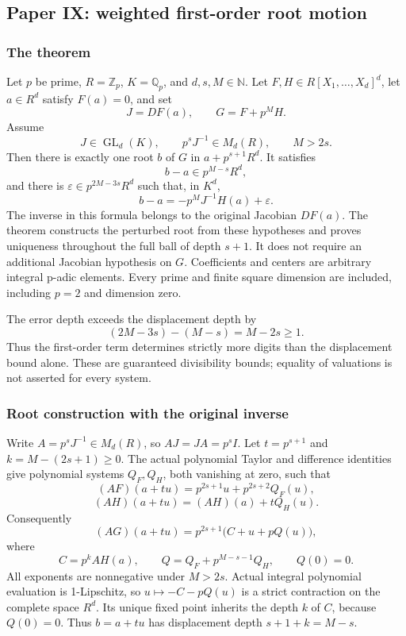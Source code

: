 \hypertarget{cont7:paper-ix-weighted-first-order-root-motion}{%
\subsection{Paper IX: weighted first-order root
motion}\label{cont7:paper-ix-weighted-first-order-root-motion}}

\hypertarget{cont7:the-theorem}{%
\subsubsection{The theorem}\label{cont7:the-theorem}}

Let \(p\) be prime, \(R=\mathbb Z_p\), \(K=\mathbb Q_p\), and
\(d,s,M\in\mathbb N\). Let \(F,H\in R[X_1,\ldots,X_d]^d\), let
\(a\in R^d\) satisfy \(F(a)=0\), and set \[
J=DF(a),\qquad G=F+p^M H.
\] Assume \[
J\in\operatorname{GL}_d(K),\qquad p^sJ^{-1}\in M_d(R),\qquad M>2s.
\] Then there is exactly one root \(b\) of \(G\) in \(a+p^{s+1}R^d\). It
satisfies \[
b-a\in p^{M-s}R^d,
\] and there is \(\varepsilon\in p^{2M-3s}R^d\) such that, in \(K^d\),
\[
\boxed{b-a=-p^M J^{-1}H(a)+\varepsilon.}
\] The inverse in this formula belongs to the original Jacobian
\(DF(a)\). The theorem constructs the perturbed root from these
hypotheses and proves uniqueness throughout the full ball of depth
\(s+1\). It does not require an additional Jacobian hypothesis on \(G\).
Coefficients and centers are arbitrary integral p-adic elements. Every
prime and finite square dimension are included, including \(p=2\) and
dimension zero.

The error depth exceeds the displacement depth by \[
(2M-3s)-(M-s)=M-2s\ge1.
\] Thus the first-order term determines strictly more digits than the
displacement bound alone. These are guaranteed divisibility bounds;
equality of valuations is not asserted for every system.

\hypertarget{cont7:root-construction-with-the-original-inverse}{%
\subsubsection{Root construction with the original
inverse}\label{cont7:root-construction-with-the-original-inverse}}

Write \(A=p^sJ^{-1}\in M_d(R)\), so \(AJ=JA=p^sI\). Let \(t=p^{s+1}\)
and \(k=M-(2s+1)\ge0\). The actual polynomial Taylor and difference
identities give polynomial systems \(Q_F,Q_H\), both vanishing at zero,
such that \[
(AF)(a+tu)=p^{2s+1}u+p^{2s+2}Q_F(u),
\] \[
(AH)(a+tu)=(AH)(a)+tQ_H(u).
\] Consequently \[
(AG)(a+tu)=p^{2s+1}\bigl(C+u+pQ(u)\bigr),
\] where \[
C=p^kAH(a),\qquad
Q=Q_F+p^{M-s-1}Q_H,\qquad Q(0)=0.
\] All exponents are nonnegative under \(M>2s\). Actual integral
polynomial evaluation is 1-Lipschitz, so \(u\mapsto-C-pQ(u)\) is a
strict contraction on the complete space \(R^d\). Its unique fixed point
inherits the depth \(k\) of \(C\), because \(Q(0)=0\). Thus \(b=a+tu\)
has displacement depth \(s+1+k=M-s\).

